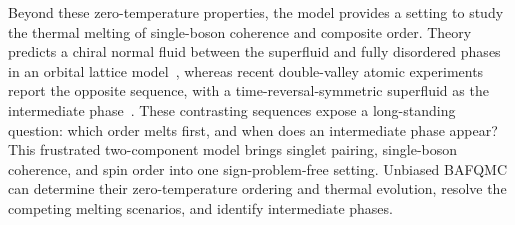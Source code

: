 Beyond these zero-temperature properties, the model provides a setting to study the thermal melting of single-boson coherence and composite order. Theory predicts a chiral normal fluid between the superfluid and fully disordered phases in an orbital lattice model~\cite{liParamekantiHemmerich2014chiral}, whereas recent double-valley atomic experiments report the opposite sequence, with a time-reversal-symmetric superfluid as the intermediate phase~\cite{yuWuZhang2025vestigial}. These contrasting sequences expose a long-standing question: which order melts first, and when does an intermediate phase appear? This frustrated two-component model brings singlet pairing, single-boson coherence, and spin order into one sign-problem-free setting. Unbiased BAFQMC can determine their zero-temperature ordering and thermal evolution, resolve the competing melting scenarios, and identify intermediate phases.

